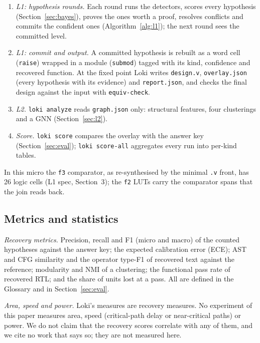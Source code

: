 \documentclass[conference]{IEEEtran}
\newcommand{\code}[1]{\texttt{#1}}
\begin{document}
\begin{enumerate}
 into a fresh Odin~III design, level~0, in which every logic cell is a function (a LUT by its
 truth table, a gate by its library function). On \code{f1} with hard cells the \code{unmap}
 pass runs on the working copy and its facts feed the \code{hard} detector.
\item \emph{L1: hypothesis rounds.} Each round runs the detectors, scores every hypothesis
 (Section~\ref{sec:bayes}), proves the ones worth a proof, resolves conflicts and commits the
 confident ones (Algorithm~\ref{alg:l1}); the next round sees the committed level.
\item \emph{L1: commit and output.} A committed hypothesis is rebuilt as a word cell
 (\code{raise}) wrapped in a module (\code{submod}) tagged with its kind, confidence and
 recovered function. At the fixed point Loki writes \code{design.v}, \code{overlay.json}
 (every hypothesis with its evidence) and \code{report.json}, and checks the final design
 against the input with \code{equiv-check}.
\item \emph{L2.} \code{loki analyze} reads \code{graph.json} only: structural features, four
 clusterings and a GNN (Section~\ref{sec:l2}).
\item \emph{Score.} \code{loki score} compares the overlay with the answer key
 (Section~\ref{sec:eval}); \code{loki score-all} aggregates every run into per-kind tables.
\end{enumerate}

In this micro the \code{f3} comparator, as re-synthesised by the minimal \code{.v} front, has 26 logic cells (L1 spec,
Section~3); the \code{f2} LUTs carry the comparator spans that the join reads back.

\subsection{Metrics and statistics}
\label{sec:metrics}

\emph{Recovery metrics.} Precision, recall and F1 (micro and macro) of the counted hypotheses
against the answer key; the expected calibration error (ECE); AST and CFG similarity and the
operator type-F1 of recovered text against the reference; modularity and NMI of a clustering;
the functional pass rate of recovered RTL; and the share of units lost at a pass. All are
defined in the Glossary and in Section~\ref{sec:eval}.

\emph{Area, speed and power.} Loki's measures are recovery measures. No experiment of this paper
measures area, speed (critical-path delay or near-critical paths) or power. We do not claim that
the recovery scores correlate with any of them, and we cite no work that says so; they are not
measured here.
\end{document}
